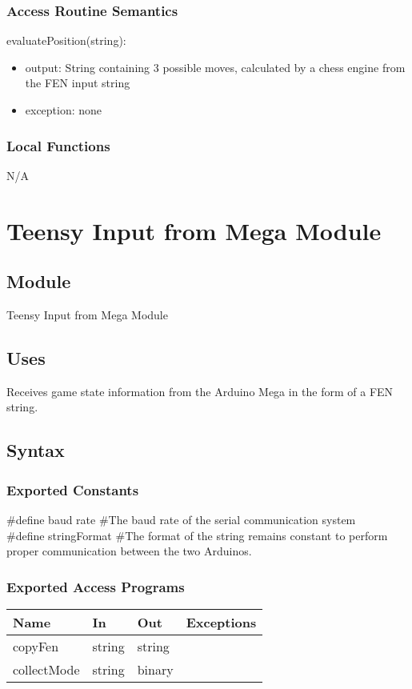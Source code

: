 \documentclass[12pt, titlepage]{article}
\begin{document}
    \subsubsection{Access Routine Semantics}
        \noindent evaluatePosition(string):
        \begin{itemize}
            \item output: String containing 3 possible moves, calculated by a chess engine from the FEN input string
            \item exception: none
        \end{itemize}

    \subsubsection{Local Functions}
    N/A

    \newpage

    \section{Teensy Input from Mega Module} \label{TeensyToMegaRx}
        \subsection{Module}
        Teensy Input from Mega Module
    
        \subsection{Uses}
        Receives game state information from the Arduino Mega in the form of a FEN string. 
    
        \subsection{Syntax}
        \subsubsection{Exported Constants}
        \#define baud rate \#The baud rate of the serial communication system\\
        \#define stringFormat \#The format of the string remains constant to perform proper 
        communication between the two Arduinos.
        
        \subsubsection{Exported Access Programs}
            \begin{center}
            \begin{tabular}{p{4cm} p{3cm} p{3cm} p{2.5cm}}
            \hline
            \textbf{Name} & \textbf{In} & \textbf{Out} & \textbf{Exceptions} \\
            \hline
            copyFen & string & string & \\
            collectMode & string & binary & \\
            \hline
            \end{tabular}
            \end{center}
    
\end{document}
